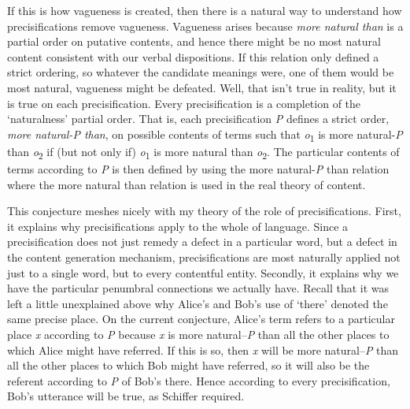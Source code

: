 If this is how vagueness is created, then there is a natural way to understand how precisifications remove vagueness. Vagueness arises because \textit{more natural than} is a partial order on putative contents, and hence there might be no most natural content consistent with our verbal dispositions. If this relation only defined a strict ordering, so whatever the candidate meanings were, one of them would be most natural, vagueness might be defeated. Well, that isn't true in reality, but it is true on each precisification. Every precisification is a completion of the `naturalness' partial order. That is, each precisification \textit{P} defines a strict order, \textit{more natural-P than}, on possible contents of terms such that \textit{o}\textsubscript{1} is more natural-\textit{P} than \textit{o}\textsubscript{2} if (but not only if) \textit{o}\textsubscript{1} is more natural than \textit{o}\textsubscript{2}. The particular contents of terms according to \textit{P} is then defined by using the more natural-\textit{P} than relation where the more natural than relation is used in the real theory of content.

This conjecture meshes nicely with my theory of the role of precisifications. First, it explains why precisifications apply to the whole of language. Since a precisification does not just remedy a defect in a particular word, but a defect in the content generation mechanism, precisifications are most naturally applied not just to a single word, but to every contentful entity. Secondly, it explains why we have the particular penumbral connections we actually have. Recall that it was left a little unexplained above why Alice's and Bob's use of `there' denoted the same precise place. On the current conjecture, Alice's term refers to a particular place \textit{x} according to \textit{P} because \textit{x} is more natural--\textit{P} than all the other places to which Alice might have referred. If this is so, then \textit{x} will be more natural--\textit{P} than all the other places to which Bob might have referred, so it will also be the referent according to \textit{P} of Bob's there. Hence according to every precisification, Bob's utterance will be true, as Schiffer required.

